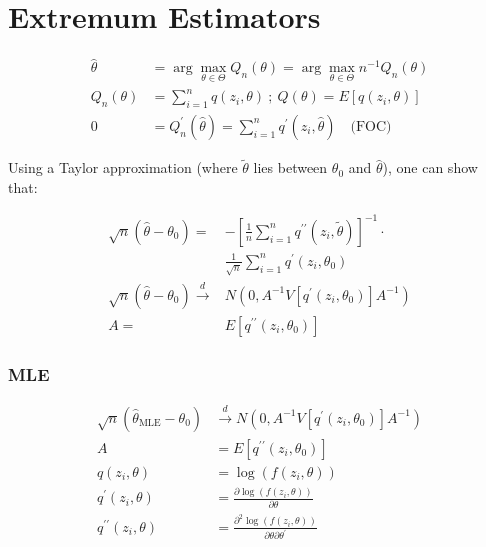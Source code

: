 \section{Extremum Estimators}

\begin{align*}
    \widehat{\theta} &= \arg \max _{\theta \in \Theta} Q_n(\theta)=\arg \max _{\theta \in \Theta} n^{-1} Q_n(\theta) \\
    Q_n(\theta) &= \sum_{i=1}^n q\left(z_i, \theta\right) \: ; \: Q(\theta)=E\left[q\left(z_i, \theta\right)\right] \\
    0 &= Q_n^{\prime}(\widehat{\theta})=\sum_{i=1}^n q^{\prime}\left(z_i, \widehat{\theta}\right) \quad \text{(FOC)}
\end{align*}

Using a Taylor approximation (where $\tilde{\theta}$ lies between $\theta_0$ and $\hat{\theta}$), one can show that:

\begin{align*}
    \sqrt{n} \left(\widehat{\theta}-\theta_0\right)= &-\left[\frac{1}{n} \sum_{i=1}^n q^{\prime \prime}\left(z_i, \widetilde{\theta}\right)\right]^{-1} \cdot \\
    &\frac{1}{\sqrt{n}} \sum_{i=1}^n q^{\prime}\left(z_i, \theta_0\right) \\
    \sqrt{n} \left(\widehat{\theta}-\theta_0\right) \stackrel{d}{\longrightarrow}& N\left(0, A^{-1} V \left[q^{\prime}\left(z_i, \theta_0\right)\right] A^{-1}\right) \\
    A =& E\left[q^{\prime \prime}\left(z_i, \theta_0\right)\right]
\end{align*}

\subsubsection{MLE}

\begin{align*}
    \sqrt{n}\left( \widehat{\theta}_{\mathrm{MLE}}-\theta_0 \right)  &\stackrel{d}{\longrightarrow}  
    N\left(0, A^{-1} V\left[q^{\prime}\left(z_i, \theta_0\right)\right] A^{-1}\right) \\
    A &= E\left[q^{\prime \prime}\left(z_i, \theta_0\right)\right] \\
    q\left(z_i, \theta\right) & =\log \left(f\left(z_i, \theta\right)\right) \\
    q^{\prime}\left(z_i, \theta\right) & =\frac{\partial \log \left(f\left(z_i, \theta\right)\right)}{\partial \theta} \\
    q^{\prime \prime}\left(z_i, \theta\right) & =\frac{\partial^2 \log \left(f\left(z_i, \theta\right)\right)}{\partial \theta \partial \theta^{\prime}}
\end{align*}

